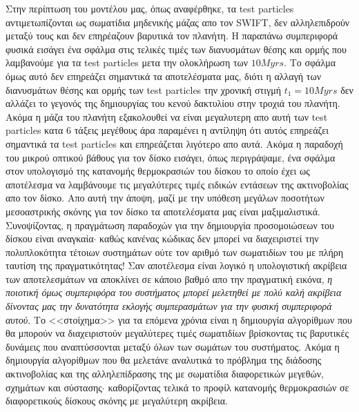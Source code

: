 Στην περίπτωση του μοντέλου μας, όπως αναφέρθηκε, τα {\en test particles} αντιμετωπίζονται ως σωματίδια μηδενικής μάζας απο τον {\en SWIFT}, δεν αλληλεπιδρούν μεταξύ τους και δεν επηρέαζουν βαρυτικά τον πλανήτη. Η παραπάνω συμπεριφορά φυσικά εισάγει ένα σφάλμα στις τελικές τιμές των διανυσμάτων θέσης και ορμής που λαμβανούμε για τα {\en test particles} μετα την ολοκλήρωση των $10Myrs$. Το σφάλμα όμως αυτό δεν επηρεάζει σημαντικά τα αποτελέσματα μας, διότι η αλλαγή των διανυσμάτων θέσης και ορμής των {\en test particles} την χρονική στιγμή $t_1=10Myrs$ δεν αλλάζει το γεγονός της δημιουργίας του κενού δακτυλίου στην τροχιά του πλανήτη. Ακόμα η μάζα του πλανήτη εξακολουθεί να είναι μεγαλυτερη απο αυτή των {\en test particles} κατα 6 τάξεις μεγέθους άρα παραμένει η αντίληψη ότι αυτός επηρεάζει σημαντικά τα {\en test particles} και επηρεάζεται λιγότερο απο αυτά. Ακόμα η παραδοχή του μικρού οπτικού βάθους για τον δίσκο εισάγει, όπως περιγράψαμε, ένα σφάλμα στον υπολογισμό της κατανομής θερμοκρασιών του δίσκου το οποίο έχει ως αποτέλεσμα να λαμβάνουμε τις μεγαλύτερες τιμές ειδικών εντάσεων της ακτινοβολίας απο τον δίσκο. Απο αυτή την άποψη, μαζί με την υπόθεση μεγάλων ποσοτήτων μεσοαστρικής σκόνης για τον δίσκο τα αποτελέσματα μας είναι μαξιμαλιστικά.\\

Συνοψίζοντας, η πραγμάτωση παραδοχών για την δημιουργία προσομοιώσεων του δίσκου είναι αναγκαία$\cdot$ καθώς κανένας κώδικας δεν μπορεί να διαχειριστεί την πολυπλοκότητα τέτοιων συστημάτων ούτε τον αριθμό των σωματιδίων του με πλήρη ταυτίση της πραγματικότητας! Σαν αποτέλεσμα είναι λογικό η υπολογιστική ακρίβεια των αποτελεσμάτων να αποκλίνει σε κάποιο βαθμό απο την πραγματική εικόνα, {\it η ποιοτική όμως συμπεριφόρα του συστήματος μπορεί μελετηθεί με πολύ καλή ακρίβεια δίνοντας μας την δυνατότητα εκλογής συμπερασμάτων για την φυσική συμπεριφορά αυτού}. Το <<στοίχημα>> για τα επόμενα χρόνια είναι η δημιουργία αλγορίθμων που θα μπορούν να διαχειριστούν μεγαλύτερες τιμές σωματιδίων βρίσκοντας τις βαρυτικές δυνάμεις που αναπτύσσονται μεταξύ όλων των σωμάτων του συστήματος. Ακόμα η δημιουργία αλγορίθμων που θα μελετάνε αναλυτικά το πρόβλημα της διάδοσης ακτινοβολίας και της αλληλεπίδρασης της με σωματίδια διαφορετικών μεγεθών, σχημάτων και σύστασης$\cdot$ καθορίζοντας τελικά το προφίλ κατανομής θερμοκρασιών σε διαφορετικούς δίσκους σκόνης με μεγαλύτερη ακρίβεια.
